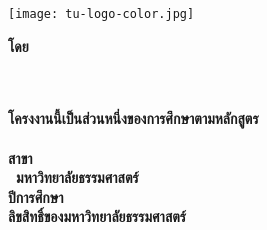 
\pagestyle{empty}
\begin{center}
	\vspace*{6mm}
	\begin{center}
		\texttt{[image: tu-logo-color.jpg]}\\
	\end{center}
	\vspace{1cm}

	\begin{spacing}{1.4}
		\textbf{\huge\titleThai}
	\end{spacing}
	\vspace*{35mm}
	\textbf{โดย}\\
	\vspace*{10mm}
	\textbf{\authorAThai}\\
	\textbf{\authorBThai}\\
	\vfill

	\begin{spacing}{1.3}
		\textbf{โครงงานนี้เป็นส่วนหนึ่งของการศึกษาตามหลักสูตร\\
			\degreeThai\\
			สาขา\majorThai\\
			\facultyThai\ มหาวิทยาลัยธรรมศาสตร์\\
			ปีการศึกษา \academicYearThai\\
			ลิขสิทธิ์ของมหาวิทยาลัยธรรมศาสตร์}
	\end{spacing}
\end{center}
